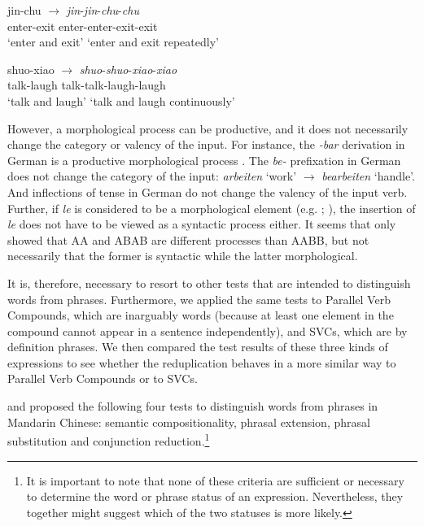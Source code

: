   \ex \gll jin-chu $\rightarrow$ \textit{jin}-\textit{jin}-\textit{chu}-\textit{chu}\\
  enter-exit {} enter-enter-exit-exit\\ 
  \glt `enter and exit' `enter and exit repeatedly'
  
  \ex \gll shuo-xiao $\rightarrow$ \textit{shuo}-\textit{shuo}-\textit{xiao}-\textit{xiao}\\
  talk-laugh {} talk-talk-laugh-laugh\\ 
  \glt `talk and laugh' `talk and laugh continuously'
  \z
\z

However, a morphological process can be productive, and it does not necessarily change the category or valency of the input.
For instance, the \textit{-bar} derivation in German is a productive morphological process \citep[330]{Mueller2002}. 
The \textit{be-} prefixation in German does not change the category of the input: \textit{arbeiten} `work' $\rightarrow$ \textit{bearbeiten} `handle'. 
And inflections of tense in German do not change the valency of the input verb.
Further, if \textit{le} is considered to be a morphological element (e.g. \citealt[101--102]{Huangetal2009}; \citealt[246]{MuellerLipenkova2013}), the insertion of \textit{le} does not have to be viewed as a syntactic
process either.
It seems that \citet{Xie2020} only showed that AA and ABAB are different processes than AABB, but not necessarily that the former is syntactic while the latter morphological.

It is, therefore, necessary to resort to other tests that are intended to distinguish words from phrases. 
Furthermore, we applied the same tests to Parallel Verb Compounds, which are inarguably words (because at least one element in the compound cannot appear in a sentence independently), 
and {SVC}s, which are by definition phrases. 
We then compared the test results of these three kinds of expressions to see whether the reduplication behaves in a more similar way to Parallel Verb Compounds or to {SVC}s.



\citet{Duanmu1998} and \citet{Schaefer2009} proposed the following four tests to
distinguish words from phrases in Mandarin Chinese: semantic compositionality, phrasal extension,
phrasal substitution and conjunction reduction.\footnote{It is important to note that none of these criteria are sufficient or necessary to determine the word or phrase status of an expression. Nevertheless, they together might suggest which of the two statuses is more likely.}

